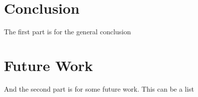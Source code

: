 \section{Conclusion}
The first part is for the general conclusion
\section{Future Work}
And the second part is for some future work. This can be a list